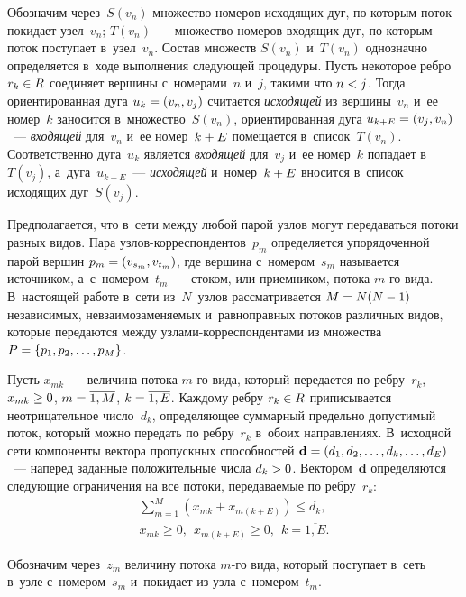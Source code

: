 \begin{multicols}{2}
Обозначим через~$S(v_n)$ множество номеров исходящих дуг, 
по которым поток покидает узел~$v_n$;
$T(v_n)$~--- множество номеров входящих дуг, по которым поток поступает 
в~узел~$v_n$.
Состав множеств $S(v_n)$ и~$T(v_n)$ однозначно 
определяется в~ходе выполнения следующей процедуры. Пусть некоторое ребро
 $r_k \hm\in R$ соединяет вершины с~номерами~$n$ и~$j$, такими что $n \hm< j$. 
 Тогда ориентированная дуга $u_k \hm= (v_n, v_j)$
считается \textit{исходящей} из вершины~$v_{n}$ и~ее номер~$k$ 
заносится в~множество~$S(v_n)$, ориентированная дуга $u_{k+E} 
\hm= (v_j, v_n)$~--- \textit{входящей} для~$v_{n}$ и~ее номер~$k\hm+E$ 
помещается в~список~$T(v_n)$.
Соответственно дуга~$u_k$ является \textit{входящей} для~$v_j$ и~ее номер~$k$ 
попадает в~$T(v_j)$, а~дуга~$u_{k+E}$~--- \textit{исходящей} и~номер~$k\hm+E$ 
вносится в~список исходящих дуг~$S(v_j)$.

Предполагается, что в~сети
между любой парой узлов могут  передаваться потоки разных видов.
Пара уз\-лов-кор\-рес\-пон\-ден\-тов~$p_m$ определяется упорядоченной 
парой вершин $p_m \hm= (v_{s_m}, v_{t_m})$,
где вершина с~номером~$s_m$ называется источником, а~с~номером~${t_m}$~--- 
стоком, или приемником, потока $m$-го вида.
В~настоящей работе в~сети из~$N$~узлов рассматривается $M \hm= 
N (N\hm-1)$ независимых, невзаимозаменяемых и~равноправных потоков 
различных видов, которые передаются между уз\-ла\-ми-кор\-рес\-пон\-ден\-та\-ми 
из множества $P \hm= \{ p_1, p_2, \ldots, p_M\}$.

Пусть $x_{mk}$~--- величина потока $m$-го вида, который передается
по ребру~$r_k$, $x_{mk}\hm \ge 0$, $m \hm= \overline{1, M}$, 
$k \hm= \overline {1, E}$. Каждому ребру $r_k \hm\in R$ 
приписывается неотрицательное число~$d_k$, определяющее 
суммарный предельно допустимый поток, который можно передать по ребру~$r_k$ 
в~обоих направлениях. В~исходной сети компоненты вектора пропускных 
способностей $\mathbf{d} \hm= (d_1, d_2, \ldots, d_k, \ldots, d_E)$~--- 
наперед заданные положительные числа $d_k \hm> 0$. Вектором~$\mathbf{d}$
 определяются следующие ограничения на все  потоки, передаваемые по ребру~$r_k$:
\begin{multline}
\sum\limits_{m=1}^{M} \left(x_{mk}+ x_{m(k+E)}\right) \le d_k,  
\\
 x_{mk} \ge 0, \ \ x_{m(k+E)} \ge 0, \ \  
k =\overline{1, E}. 
\label{e1-mal}
\end{multline}

Обозначим через~$z_m$ величину потока $m$-го вида, который 
поступает в~сеть в~узле с~номером~${s_m}$ и~покидает из узла с~номером~${t_m}$.


\end{multicols}
